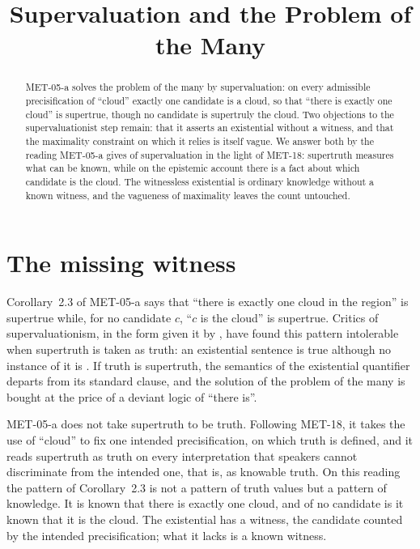 \documentclass{situationist-preprint}
\title{Supervaluation and the Problem of the Many}
\begin{document}
\maketitle

\begin{abstract}
MET-05-a solves the problem of the many by supervaluation: on every admissible precisification of \enquote{cloud} exactly one candidate is a cloud, so that \enquote{there is exactly one cloud} is supertrue, though no candidate is supertruly the cloud. Two objections to the supervaluationist step remain: that it asserts an existential without a witness, and that the maximality constraint on which it relies is itself vague. We answer both by the reading MET-05-a gives of supervaluation in the light of MET-18: supertruth measures what can be known, while on the epistemic account there is a fact about which candidate is the cloud. The witnessless existential is ordinary knowledge without a known witness, and the vagueness of maximality leaves the count untouched.
\end{abstract}

\section{The missing witness}

Corollary~2.3 of MET-05-a says that \enquote{there is exactly one cloud in the region} is supertrue while, for no candidate $c$, \enquote{$c$ is the cloud} is supertrue. Critics of supervaluationism, in the form given it by \citet{Fine1975}, have found this pattern intolerable when supertruth is taken as truth: an existential sentence is true although no instance of it is \citep[ch.~5]{Williamson1994}. If truth is supertruth, the semantics of the existential quantifier departs from its standard clause, and the solution of the problem of the many is bought at the price of a deviant logic of \enquote{there is}.

MET-05-a does not take supertruth to be truth. Following MET-18, it takes the use of \enquote{cloud} to fix one intended precisification, on which truth is defined, and it reads supertruth as truth on every interpretation that speakers cannot discriminate from the intended one, that is, as knowable truth. On this reading the pattern of Corollary~2.3 is not a pattern of truth values but a pattern of knowledge. It is known that there is exactly one cloud, and of no candidate is it known that it is the cloud. The existential has a witness, the candidate counted by the intended precisification; what it lacks is a known witness.
\end{document}
